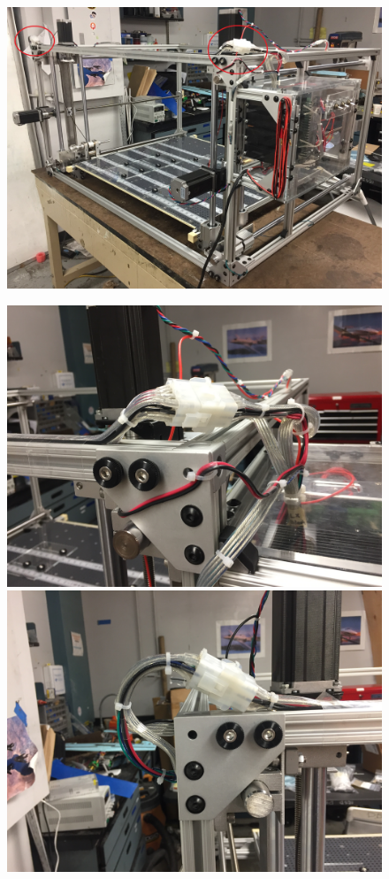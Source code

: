 \documentclass[titlepage,12pt,letter]{report}
\numberwithin{equation}{chapter}
\begin{document}
\begin{figure}[H]
	\centering
	\begin{minipage}[b]{0.603 \linewidth}
		{\includegraphics[width=\textwidth]{./Figures/molex.jpg}}
	\end{minipage}
	\begin{minipage}[b]{0.3 \linewidth}
		{\includegraphics[width=\textwidth]{./Figures/molex1.jpg}}
		\vfill
		{\includegraphics[width=\textwidth]{./Figures/molex2.jpg}}

\end{minipage}
\end{figure}
\end{document}
